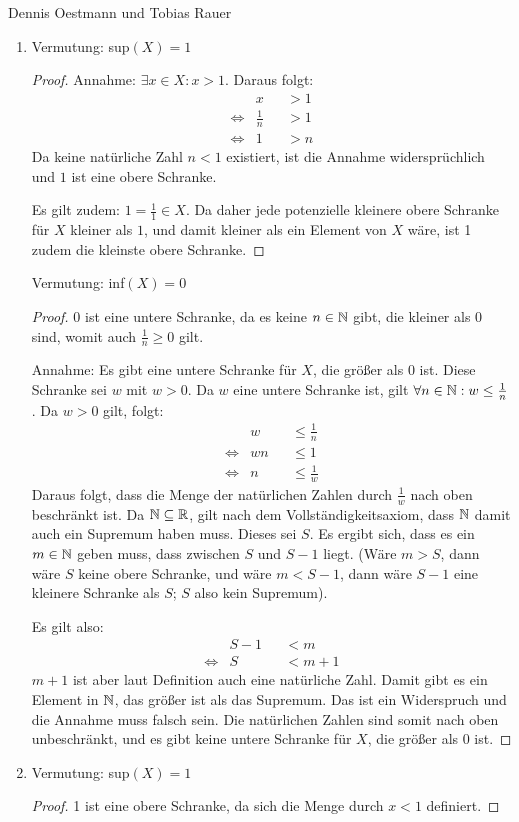 \begin{lsg}
Dennis Oestmann und Tobias Rauer
\begin{enumerate}[label=$\mathrm{(\roman*)}$, ref=$\mathrm{\roman*}$]
\item 
Vermutung: sup$(X)=1$
\begin{proof}
Annahme: $\exists x \in X:x>1$. Daraus folgt:
\begin{align*}
&x&&>1 \\
\iff &\frac{1}{n}&&>1 \\
\iff &1&&>n 
\end{align*}  
Da keine natürliche Zahl $n<1$ existiert, ist die Annahme widersprüchlich und $1$ ist eine obere Schranke.

Es gilt zudem: $1=\frac{1}{1}\in X$. Da daher jede potenzielle kleinere obere Schranke für $X$ kleiner als $1$, und damit kleiner als ein Element von $X$ wäre, ist 1 zudem die kleinste obere Schranke.
\end{proof}

Vermutung: inf$(X)=0$
\begin{proof}
0 ist eine untere Schranke, da es keine $n \in \mathbb{N}$ gibt, die kleiner als 0 sind, womit auch $\frac{1}{n} \geq 0$ gilt.

Annahme: Es gibt eine untere Schranke für $X$, die größer als 0 ist. Diese Schranke sei $w$ mit $w>0$. Da $w$ eine untere Schranke ist, gilt $\forall n\in \mathbb{N}: w \leq \frac{1}{n}$. Da $w>0$ gilt, folgt:
\begin{align*}
&w &&\leq \frac{1}{n} \\
\iff &wn &&\leq 1 \\
\iff &n &&\leq \frac{1}{w} 
\end{align*}
Daraus folgt, dass die Menge der natürlichen Zahlen durch $\frac{1}{w}$ nach oben beschränkt ist.
Da $\mathbb{N} \subseteq \mathbb{R}$, gilt nach dem Vollständigkeitsaxiom, dass $\mathbb{N}$ damit auch ein Supremum haben muss. Dieses sei $S$. Es ergibt sich, dass es ein $m \in \mathbb{N}$ geben muss, dass zwischen $S$ und $S-1$ liegt. (Wäre $m>S$, dann wäre $S$ keine obere Schranke, und wäre $m<S-1$, dann wäre $S-1$ eine kleinere Schranke als $S$; $S$ also kein Supremum).

Es gilt also:
\begin{align*}
&S-1&&<m \\
\iff &S&&<m+1 
\end{align*}
$m+1$ ist aber laut Definition auch eine natürliche Zahl. Damit gibt es ein Element in $\mathbb{N}$, das größer ist als das Supremum. Das ist ein Widerspruch und die Annahme muss falsch sein. Die natürlichen Zahlen sind somit nach oben unbeschränkt, und es gibt keine untere Schranke für $X$, die größer als 0 ist. 
\end{proof}
\item 
Vermutung: sup$(X)=1$
\begin{proof}
1 ist eine obere Schranke, da sich die Menge durch $x<1$ definiert.


\end{proof}
\end{enumerate}
\end{lsg}

